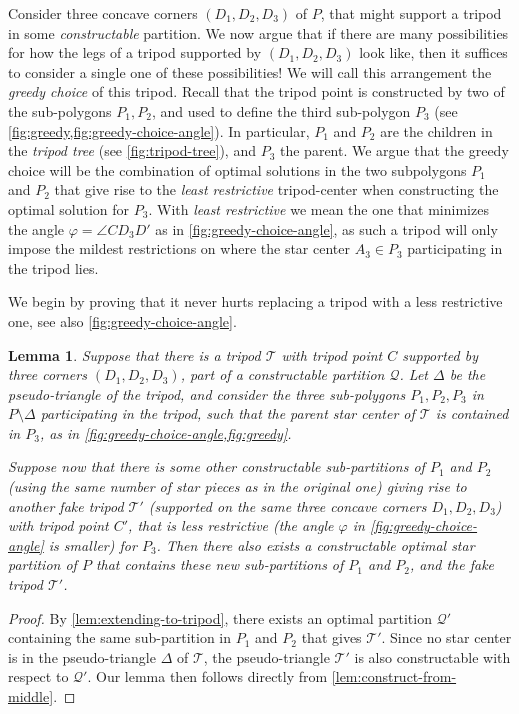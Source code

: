 \documentclass[10pt,a4paper]{article}
\newtheorem{lemma}{Lemma}[section]
\begin{document}
Consider three concave corners $(D_1, D_2, D_3)$ of $P$, that might support a tripod in some \emph{constructable} partition.
We now argue that if there are many possibilities for how the legs of a tripod supported by $(D_1, D_2, D_3)$ look like, then it suffices to consider a single one of these possibilities! We will call this arrangement the \emph{greedy choice} of this tripod. Recall that the tripod point is constructed by two of the sub-polygons $P_1,P_2$, and used to define the third sub-polygon $P_3$ (see \cref{fig:greedy,fig:greedy-choice-angle}). In particular, $P_1$ and $P_2$ are the children in the \emph{tripod tree} (see \cref{fig:tripod-tree}), and $P_3$ the parent. We argue that the greedy choice will be the combination of optimal solutions in the two subpolygons $P_1$ and $P_2$ that give rise to the \emph{least restrictive} tripod-center when constructing the optimal solution for $P_3$. With \emph{least restrictive} we mean the one that minimizes the angle $\varphi = \angle C D_3 D'$ as in \cref{fig:greedy-choice-angle}, as such a tripod will only impose the mildest restrictions on where the star center $A_3\in P_3$ participating in the tripod lies.


We begin by proving that it never hurts replacing a tripod with a less restrictive one, see also \cref{fig:greedy-choice-angle}. 
\begin{lemma}
\label{lem:less-restrictive}
Suppose that there is a tripod $\mathcal{T}$ with tripod point $C$ supported by three corners $(D_1,D_2,D_3)$, part of a constructable partition $\mathcal{Q}$.
Let $\Delta$ be the pseudo-triangle of the tripod, and consider the three sub-polygons $P_1, P_2, P_3$ in $P\setminus \Delta$ participating in the tripod, such that the parent star center of $\mathcal{T}$ is contained in $P_3$, as in \cref{fig:greedy-choice-angle,fig:greedy}.

Suppose now that there is some other constructable sub-partitions of $P_1$ and $P_2$ (using the same number of star pieces as in the original one) giving rise to another fake tripod $\mathcal{T}'$ (supported on the same three concave corners $D_1, D_2, D_3$) with tripod point $C'$, that is less restrictive (the angle $\varphi$ in \cref{fig:greedy-choice-angle} is smaller) for $P_3$. Then there also exists a constructable optimal star partition of $P$ that contains these new sub-partitions of $P_1$ and $P_2$, and the fake tripod $\mathcal{T}'$.
\end{lemma}

\begin{proof}
    By \cref{lem:extending-to-tripod}, there exists an optimal partition $\mathcal{Q}'$ containing the same sub-partition in $P_1$ and $P_2$ that gives $\mathcal{T}'$. Since no star center is in the pseudo-triangle $\Delta$ of $\mathcal{T}$, the pseudo-triangle $\mathcal{T}'$ is also constructable with respect to $\mathcal{Q}'$. 
    Our lemma then follows directly from \cref{lem:construct-from-middle}.
\end{proof}
\end{document}
